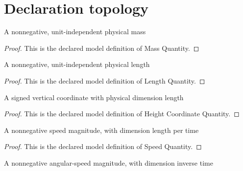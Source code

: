 \section{Declaration topology}
\begin{definition}
  \label{def:physics:phyx-mini-0713:phyxminiproblems-problemphyxmini0713-massquantity}
  A nonnegative, unit-independent physical mass
\end{definition}
\begin{proof}
  This is the declared model definition of Mass Quantity.
\end{proof}
\begin{definition}
  \label{def:physics:phyx-mini-0713:phyxminiproblems-problemphyxmini0713-lengthquantity}
  A nonnegative, unit-independent physical length
\end{definition}
\begin{proof}
  This is the declared model definition of Length Quantity.
\end{proof}
\begin{definition}
  \label{def:physics:phyx-mini-0713:phyxminiproblems-problemphyxmini0713-heightcoordinatequantity}
  A signed vertical coordinate with physical dimension length
\end{definition}
\begin{proof}
  This is the declared model definition of Height Coordinate Quantity.
\end{proof}
\begin{definition}
  \label{def:physics:phyx-mini-0713:phyxminiproblems-problemphyxmini0713-speedquantity}
  A nonnegative speed magnitude, with dimension length per time
\end{definition}
\begin{proof}
  This is the declared model definition of Speed Quantity.
\end{proof}
\begin{definition}
  \label{def:physics:phyx-mini-0713:phyxminiproblems-problemphyxmini0713-angularspeedquantity}
  A nonnegative angular-speed magnitude, with dimension inverse time
\end{definition}
